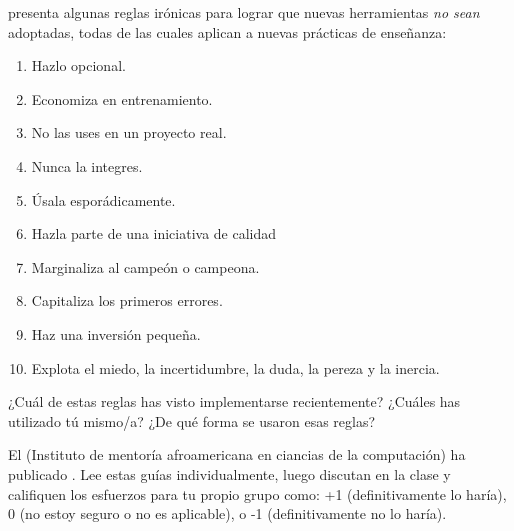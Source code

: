 \cite{Farm2006} presenta algunas reglas irónicas para lograr que nuevas herramientas \emph{no sean} adoptadas,
todas de las cuales aplican a nuevas prácticas de enseñanza:

\begin{enumerate}

\item
  Hazlo opcional.

\item
Economiza en entrenamiento. 

\item
  No las uses en un proyecto real.

\item
  Nunca la integres.

\item
Úsala esporádicamente.

\item
  Hazla parte de una iniciativa de calidad

\item
  Marginaliza al campeón o campeona.

\item
Capitaliza los primeros errores.

\item
Haz una inversión pequeña.

\item
 Explota el miedo, la incertidumbre, la duda, la pereza y la inercia.

\end{enumerate}
¿Cuál de estas reglas has visto implementarse recientemente?
¿Cuáles has utilizado tú mismo/a?
¿De qué forma se usaron esas reglas?


El  (Instituto de mentoría afroamericana en ciancias de la computación)
ha publicado .
Lee estas guías individualmente,
luego discutan en la clase
y califiquen los esfuerzos para tu propio grupo como: +1 (definitivamente lo haría),
0 (no estoy seguro o no es aplicable),
o -1 (definitivamente no lo haría).
